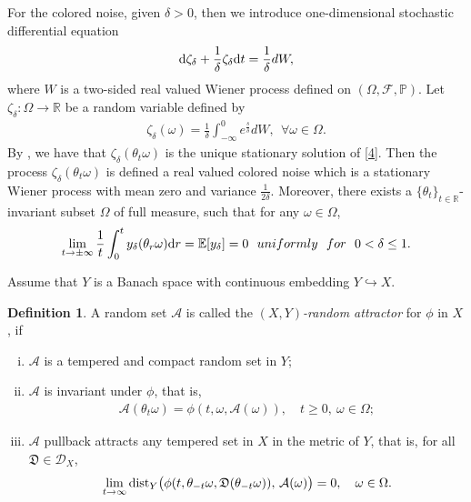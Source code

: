 \documentclass{elsarticle}
\theoremstyle{definition}
\newtheorem{definition}[theorem]{Definition}
\numberwithin{equation}{section}
\renewcommand{\d}{{\rm{d}}}
\begin{document}
For the colored noise, given $\delta>0$, then we introduce one-dimensional stochastic differential equation
\begin{align}\label{4}
\d \zeta_{\delta}+\frac{1}{\delta}\zeta_{\delta}\d t= \frac{1}{\delta}dW,
\end{align}
where $W$ is a two-sided real valued Wiener process defined on $(\Omega,\mathcal{F},\mathbb{P})$. Let $\zeta_{\delta}:\Omega\rightarrow\mathbb{R}$ be a random variable defined by
\begin{align*}
\zeta_{\delta}(\omega)= \frac{1}{\delta}\int_{-\infty}^0e^{ \frac{s}{\delta}}dW,~~\forall \omega\in\Omega.
\end{align*}
By \cite{gu2020,gu2019}, we have that $\zeta_{\delta}(\theta_t\omega)$ is the unique stationary solution of \eqref{4}. Then the process $\zeta_{\delta}(\theta_t\omega)$ is defined a real valued colored noise which is a stationary Wiener process with mean zero and variance $\frac{1}{2\delta}$. Moreover, there exists a $\{\theta_t\}_{t\in\mathbb{R}}$-invariant subset $\Omega$ of full measure, such that for any $\omega\in \Omega$,
 \begin{align}\label{5}
\lim\limits_{t\rightarrow\pm\infty}\frac{1}{t}\int_0^ty_{\delta}(\theta_r\omega)\d r=\mathbb{E}[y_{\delta}]=0~~uniformly~~for~~0<\delta\leq1.
  \end{align}





Assume that $Y$ is a Banach space with continuous embedding $Y \hookrightarrow X$.
\begin{definition}
A random set $\mathcal{A}$   is called  the {\emph{$(X,Y)$-random attractor}}  for $\phi$ in $X$,  if
\begin{enumerate}[(i)]
\item  $\mathcal{A}$ is a tempered and compact random set in $Y$;

 \item  $\mathcal{A}$ is invariant under $\phi$, that is,
\begin{align*}
\mathcal{A}(\theta_t\omega)=\phi(t,\omega,\mathcal{A}(\omega)), \quad t\geq0,~\omega\in\Omega;
\end{align*}

 \item $\mathcal{A}$  pullback attracts any tempered set in $X$ in the metric of $Y$, that is,  for all $\mathfrak D\in  \mathcal{D}_X$,
 \[
\lim\limits_{t\rightarrow\infty} {\rm dist}_{Y} \big(\phi(t,\theta_{-t}\omega, \mathfrak D(\theta_{-t}\omega)), \, \mathcal{A}(\omega) \big)=0,\quad \omega\in\Omega .
 \]
\end{enumerate}
\end{definition}
\end{document}
